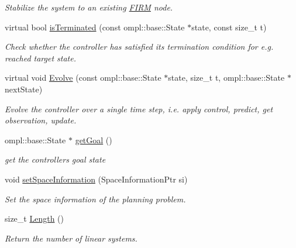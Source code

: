 \begin{DoxyCompactItemize}
\begin{DoxyCompactList}\small\item\em \-Stabilize the system to an existing \hyperlink{class_f_i_r_m}{\-F\-I\-R\-M} node. \end{DoxyCompactList}\item 
\hypertarget{class_controller_ab80efffa3b03aa4d1d10c0bf82675201}{virtual bool \hyperlink{class_controller_ab80efffa3b03aa4d1d10c0bf82675201}{is\-Terminated} (const ompl\-::base\-::\-State $\ast$state, const size\-\_\-t t)}\label{class_controller_ab80efffa3b03aa4d1d10c0bf82675201}

\begin{DoxyCompactList}\small\item\em \-Check whether the controller has satisfied its termination condition for e.\-g. reached target state. \end{DoxyCompactList}\item 
\hypertarget{class_controller_a64c3c47732f138326490303858133ae7}{virtual void \hyperlink{class_controller_a64c3c47732f138326490303858133ae7}{\-Evolve} (const ompl\-::base\-::\-State $\ast$state, size\-\_\-t t, ompl\-::base\-::\-State $\ast$next\-State)}\label{class_controller_a64c3c47732f138326490303858133ae7}

\begin{DoxyCompactList}\small\item\em \-Evolve the controller over a single time step, i.\-e. apply control, predict, get observation, update. \end{DoxyCompactList}\item 
\hypertarget{class_controller_a848b1e5a3dc6d36c3ede121b7461d896}{ompl\-::base\-::\-State $\ast$ \hyperlink{class_controller_a848b1e5a3dc6d36c3ede121b7461d896}{get\-Goal} ()}\label{class_controller_a848b1e5a3dc6d36c3ede121b7461d896}

\begin{DoxyCompactList}\small\item\em get the controllers goal state \end{DoxyCompactList}\item 
\hypertarget{class_controller_ac0b9c339df7157c73d61b7064f88483c}{void \hyperlink{class_controller_ac0b9c339df7157c73d61b7064f88483c}{set\-Space\-Information} (\-Space\-Information\-Ptr si)}\label{class_controller_ac0b9c339df7157c73d61b7064f88483c}

\begin{DoxyCompactList}\small\item\em \-Set the space information of the planning problem. \end{DoxyCompactList}\item 
\hypertarget{class_controller_a2aa89a4cd76ba7fb6ad717d608b8c355}{size\-\_\-t \hyperlink{class_controller_a2aa89a4cd76ba7fb6ad717d608b8c355}{\-Length} ()}\label{class_controller_a2aa89a4cd76ba7fb6ad717d608b8c355}

\begin{DoxyCompactList}\small\item\em \-Return the number of linear systems. \end{DoxyCompactList}\end{DoxyCompactItemize}
